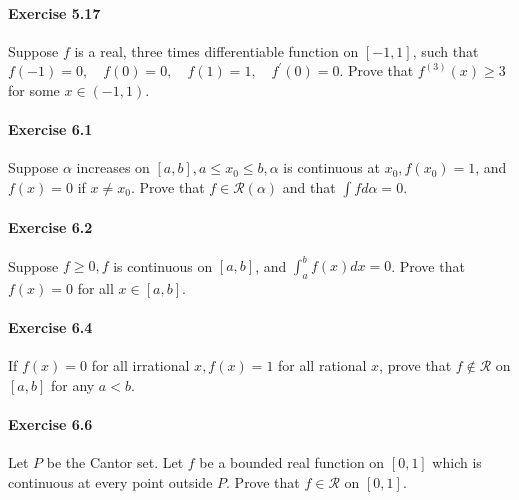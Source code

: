 \documentclass{article}
\begin{document}
\paragraph{Exercise 5.17} Suppose $f$ is a real, three times differentiable function on $[-1,1]$, such that $f(-1)=0, \quad f(0)=0, \quad f(1)=1, \quad f^{\prime}(0)=0 .$ Prove that $f^{(3)}(x) \geq 3$ for some $x \in(-1,1)$.

\paragraph{Exercise 6.1} Suppose $\alpha$ increases on $[a, b], a \leq x_{0} \leq b, \alpha$ is continuous at $x_{0}, f\left(x_{0}\right)=1$, and $f(x)=0$ if $x \neq x_{0}$. Prove that $f \in \mathcal{R}(\alpha)$ and that $\int f d \alpha=0$.

\paragraph{Exercise 6.2} Suppose $f \geq 0, f$ is continuous on $[a, b]$, and $\int_{a}^{b} f(x) d x=0$. Prove that $f(x)=0$ for all $x \in[a, b]$.

\paragraph{Exercise 6.4} If $f(x)=0$ for all irrational $x, f(x)=1$ for all rational $x$, prove that $f \notin \mathcal{R}$ on $[a, b]$ for any $a<b$.

\paragraph{Exercise 6.6} Let $P$ be the Cantor set. Let $f$ be a bounded real function on $[0,1]$ which is continuous at every point outside $P$. Prove that $f \in \mathcal{R}$ on $[0,1]$.
\end{document}
